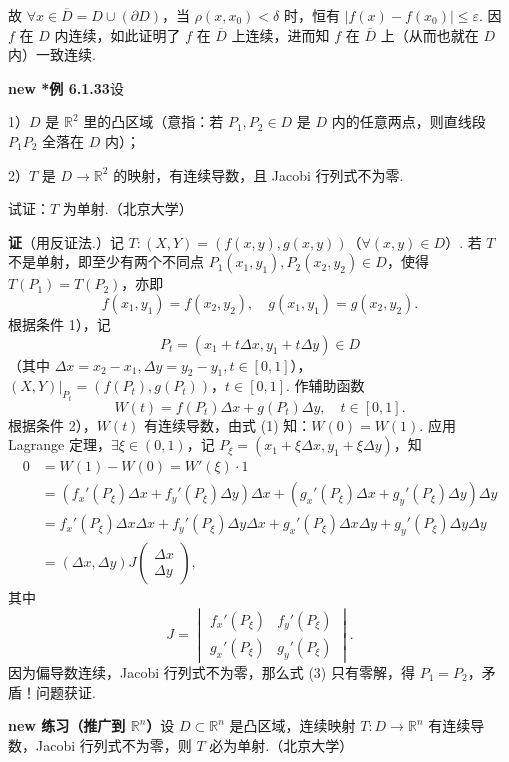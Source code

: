 \documentclass[UTF8,12pt,a4paper,fontset=fandol]{ctexart}
\begin{document}
故 $\forall x\in\overline D=D\cup(\partial D)$，当 $\rho(x,x_0)<\delta$ 时，恒有 $|f(x)-f(x_0)|\le\varepsilon$. 因 $f$ 在 $D$ 内连续，如此证明了 $f$ 在 $\overline D$ 上连续，进而知 $f$ 在 $\overline D$ 上（从而也就在 $D$ 内）一致连续.

\noindent\textbf{new *例 6.1.33}\quad 设

1）$D$ 是 $\mathbb{R}^2$ 里的凸区域（意指：若 $P_1,P_2\in D$ 是 $D$ 内的任意两点，则直线段 $P_1P_2$ 全落在 $D$ 内）；

2）$T$ 是 $D\to\mathbb{R}^2$ 的映射，有连续导数，且 Jacobi 行列式不为零.

试证：$T$ 为单射.（北京大学）

\noindent\textbf{证}\quad （用反证法.）记 $T:(X,Y)=(f(x,y),g(x,y))$（$\forall(x,y)\in D$）. 若 $T$ 不是单射，即至少有两个不同点 $P_1(x_1,y_1),P_2(x_2,y_2)\in D$，使得 $T(P_1)=T(P_2)$，亦即
\[
  f(x_1,y_1)=f(x_2,y_2),\quad g(x_1,y_1)=g(x_2,y_2). \tag{1}
\]
根据条件 1），记
\[
  P_t=(x_1+t\Delta x,y_1+t\Delta y)\in D
\]
（其中 $\Delta x=x_2-x_1,\Delta y=y_2-y_1,t\in[0,1]$），$(X,Y)|_{P_t}=(f(P_t),g(P_t))$，$t\in[0,1]$. 作辅助函数
\[
  W(t)=f(P_t)\Delta x+g(P_t)\Delta y,\quad t\in[0,1]. \tag{2}
\]
根据条件 2），$W(t)$ 有连续导数，由式 (1) 知：$W(0)=W(1)$. 应用 Lagrange 定理，$\exists\xi\in(0,1)$，记 $P_\xi=(x_1+\xi\Delta x,y_1+\xi\Delta y)$，知
\[
\begin{aligned}
0&=W(1)-W(0)=W'(\xi)\cdot1\\
&=(f_x'(P_\xi)\Delta x+f_y'(P_\xi)\Delta y)\Delta x
+(g_x'(P_\xi)\Delta x+g_y'(P_\xi)\Delta y)\Delta y\\
&=f_x'(P_\xi)\Delta x\Delta x+f_y'(P_\xi)\Delta y\Delta x
+g_x'(P_\xi)\Delta x\Delta y+g_y'(P_\xi)\Delta y\Delta y\\
&=(\Delta x,\Delta y)J
\begin{pmatrix}
\Delta x\\
\Delta y
\end{pmatrix},
\end{aligned}
\tag{3}
\]
其中
\[
  J=
  \begin{vmatrix}
  f_x'(P_\xi)&f_y'(P_\xi)\\
  g_x'(P_\xi)&g_y'(P_\xi)
  \end{vmatrix}.
\]
因为偏导数连续，Jacobi 行列式不为零，那么式 (3) 只有零解，得 $P_1=P_2$，矛盾！问题获证.

\noindent\textbf{new 练习（推广到 $\mathbb{R}^n$）}\quad 设 $D\subset\mathbb{R}^n$ 是凸区域，连续映射 $T:D\to\mathbb{R}^n$ 有连续导数，Jacobi 行列式不为零，则 $T$ 必为单射.（北京大学）
\end{document}
